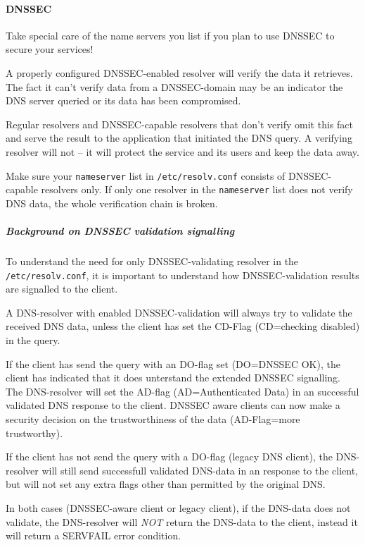 
\paragraph{DNSSEC} Take special care of the name servers you list if you plan to
use DNSSEC to secure your services!

A properly configured DNSSEC-enabled resolver will verify the data it retrieves.
The fact it can't verify data from a DNSSEC-domain may be an indicator the DNS
server queried or its data has been compromised.

Regular resolvers and DNSSEC-capable resolvers that don't verify omit this fact
and serve the result to the application that initiated the DNS query. A
verifying resolver will not -- it will protect the service and its users and
keep the data away.

Make sure your \verb|nameserver| list in \verb|/etc/resolv.conf| consists of
DNSSEC-capable resolvers only. If only one resolver in the
\verb|nameserver| list does not verify DNS data, the whole verification chain is
broken.

\subparagraph{Background on DNSSEC validation signalling}

To understand the need for only DNSSEC-validating resolver in the
\verb|/etc/resolv.conf|, it is important to understand how
DNSSEC-validation results are signalled to the client. 

A DNS-resolver with enabled DNSSEC-validation will always try to
validate the received DNS data, unless the client has set the CD-Flag
(CD=checking disabled) in the query. 

If the client has send the query with an DO-flag set (DO=DNSSEC OK),
the client has indicated that it does unterstand the extended DNSSEC
signalling. The DNS-resolver will set the AD-flag (AD=Authenticated
Data) in an successful validated DNS response to the client. DNSSEC
aware clients can now make a security decision on the trustworthiness
of the data (AD-Flag=more trustworthy).

If the client has not send the query with a DO-flag (legacy DNS
client), the DNS-resolver will still send successfull validated
DNS-data in an response to the client, but will not set any extra
flags other than permitted by the original DNS.

In both cases (DNSSEC-aware client or legacy client), if the DNS-data
does not validate, the DNS-resolver will \emph{NOT} return the
DNS-data to the client, instead it will return a SERVFAIL error
condition. 

